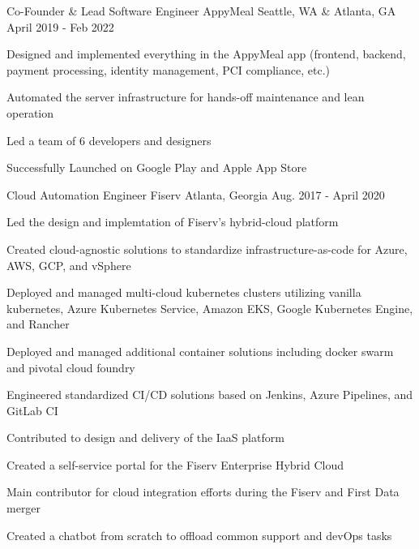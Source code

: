 \begin{cventries}
\cventry
{Co-Founder \& Lead Software Engineer} %
{AppyMeal} %
{Seattle, WA \& Atlanta, GA} %
{April 2019 - Feb 2022} %
{ %
\begin{cvitems}
\item {Designed and implemented everything in the AppyMeal app (frontend, backend, payment processing, \newline identity management, PCI compliance, etc.)}
\item {Automated the server infrastructure for hands-off maintenance and lean operation}
\item {Led a team of 6 developers and designers}
\item {Successfully Launched on Google Play and Apple App Store}
\end{cvitems}
}

\cventry
{Cloud Automation Engineer} %
{Fiserv} %
{Atlanta, Georgia} %
{Aug. 2017 - April 2020} %
{ %
\begin{cvitems}
\item {Led the design and implemtation of Fiserv's hybrid-cloud platform}
\item {Created cloud-agnostic solutions to standardize infrastructure-as-code for Azure, AWS, GCP, and vSphere}
\item {Deployed and managed multi-cloud kubernetes clusters utilizing vanilla kubernetes, Azure Kubernetes Service, Amazon EKS, Google Kubernetes Engine, and Rancher}
\item {Deployed and managed additional container solutions including docker swarm and pivotal cloud foundry}
\item {Engineered standardized CI/CD solutions based on Jenkins, Azure Pipelines, and GitLab CI}
\item {Contributed to design and delivery of the IaaS platform}
\item {Created a self-service portal for the Fiserv Enterprise Hybrid Cloud}
\item {Main contributor for cloud integration efforts during the Fiserv and First Data merger}
\item {Created a chatbot from scratch to offload common support and devOps tasks}
\end{cvitems}
}



\end{cventries}
